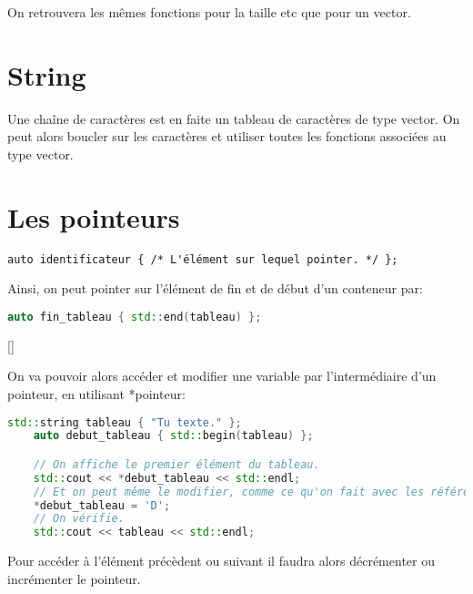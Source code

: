 \documentclass{article}
\begin{document}
On retrouvera les mêmes fonctions pour la taille etc que pour un vector.

\section{String}
Une chaîne de caractères est en faite un tableau de caractères de type vector. On peut alors boucler sur les caractères et utiliser toutes les fonctions associées au type vector.


\section{Les pointeurs}
\begin{lstlisting}[language=C++
    // Dans le cas d'un conteneur modifiable.
std::/* Le conteneur utilisé. */::iterator identificateur { /* L'élément sur lequel pointer. */ };
// Dans le cas d'un conteneur const.
std::/* Le conteneur utilisé. */::const_iterator identificateur { /* L'élément sur lequel pointer. */ };
\end{lstlisting}

\begin{lstlisting}[language=C++]
    auto identificateur { /* L'élément sur lequel pointer. */ };
\end{lstlisting}{}

Ainsi, on peut pointer sur l'élément de fin et de début d'un conteneur par:
\begin{lstlisting}[language=C++]
        auto fin_tableau { std::end(tableau) };
\end{lstlisting}[]

On va pouvoir alors accéder et modifier une variable par l'intermédiaire d'un pointeur, en utilisant *pointeur:

\begin{lstlisting}[language=C++]
            std::string tableau { "Tu texte." };
    auto debut_tableau { std::begin(tableau) };

    // On affiche le premier élément du tableau.
    std::cout << *debut_tableau << std::endl;
    // Et on peut même le modifier, comme ce qu'on fait avec les références, ou les crochets.
    *debut_tableau = 'D';
    // On vérifie.
    std::cout << tableau << std::endl;

\end{lstlisting}

Pour accéder à l'élément précèdent ou suivant il faudra alors décrémenter ou incrémenter le pointeur.
\end{document}
